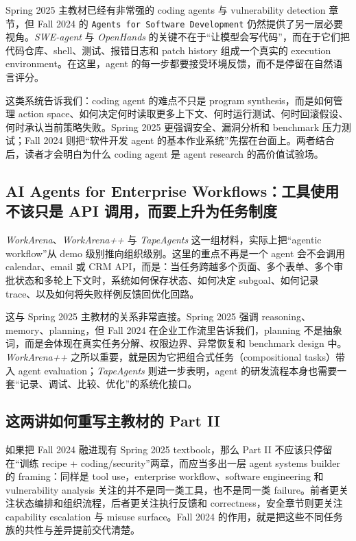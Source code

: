 Spring 2025 主教材已经有非常强的 coding agents 与 vulnerability detection 章节，但 Fall 2024 的 \texttt{Agents for Software Development} 仍然提供了另一层必要视角。\textit{SWE-agent} 与 \textit{OpenHands} 的关键不在于“让模型会写代码”，而在于它们把代码仓库、shell、测试、报错日志和 patch history 组成一个真实的 execution environment。在这里，agent 的每一步都要接受环境反馈，而不是停留在自然语言评分。

这类系统告诉我们：coding agent 的难点不只是 program synthesis，而是如何管理 action space、如何决定何时读取更多上下文、何时运行测试、何时回滚假设、何时承认当前策略失败。Spring 2025 更强调安全、漏洞分析和 benchmark 压力测试；Fall 2024 则把“软件开发 agent 的基本作业系统”先摆在台面上。两者结合后，读者才会明白为什么 coding agent 是 agent research 的高价值试验场。

\subsection{AI Agents for Enterprise Workflows：工具使用不该只是 API 调用，而要上升为任务制度}

\textit{WorkArena}、\textit{WorkArena++} 与 \textit{TapeAgents} 这一组材料，实际上把“agentic workflow”从 demo 级别推向组织级别。这里的重点不再是一个 agent 会不会调用 calendar、email 或 CRM API，而是：当任务跨越多个页面、多个表单、多个审批状态和多轮上下文时，系统如何保存状态、如何决定 subgoal、如何记录 trace、以及如何将失败样例反馈回优化回路。

这与 Spring 2025 主教材的关系非常直接。Spring 2025 强调 reasoning、memory、planning，但 Fall 2024 在企业工作流里告诉我们，planning 不是抽象词，而是会体现在真实任务分解、权限边界、异常恢复和 benchmark design 中。\textit{WorkArena++} 之所以重要，就是因为它把组合式任务（compositional tasks）带入 agent evaluation；\textit{TapeAgents} 则进一步表明，agent 的研发流程本身也需要一套“记录、调试、比较、优化”的系统化接口。

\subsection{这两讲如何重写主教材的 Part II}

如果把 Fall 2024 融进现有 Spring 2025 textbook，那么 Part II 不应该只停留在“训练 recipe + coding/security”两章，而应当多出一层 agent systems builder 的 framing：同样是 tool use，enterprise workflow、software engineering 和 vulnerability analysis 关注的并不是同一类工具，也不是同一类 failure。前者更关注状态编排和组织流程，后者更关注执行反馈和 correctness，安全章节则更关注 capability escalation 与 misuse surface。Fall 2024 的作用，就是把这些不同任务族的共性与差异提前交代清楚。

